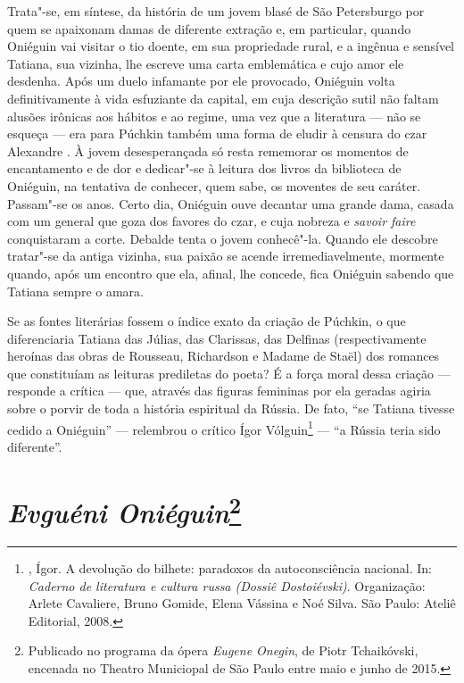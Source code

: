 Trata"-se, em síntese, da história de um jovem blasé de São Petersburgo
por quem se apaixonam damas de diferente extração e, em particular,
quando Oniéguin vai visitar o tio doente, em sua propriedade rural, e a
ingênua e sensível Tatiana, sua vizinha, lhe escreve uma carta
emblemática e cujo amor ele desdenha. Após um duelo infamante por ele
provocado, Oniéguin volta definitivamente à vida esfuziante da capital,
em cuja descrição sutil não faltam alusões irônicas aos hábitos e ao
regime, uma vez que a literatura --- não se esqueça --- era para Púchkin
também uma forma de eludir à censura do czar Alexandre . À jovem
desesperançada só resta rememorar os momentos de encantamento e de dor e
dedicar"-se à leitura dos livros da biblioteca de Oniéguin, na tentativa
de conhecer, quem sabe, os moventes de seu caráter. Passam"-se os anos.
Certo dia, Oniéguin ouve decantar uma grande dama, casada com um general
que goza dos favores do czar, e cuja nobreza e \emph{savoir faire} conquistaram
a corte. Debalde tenta o jovem conhecê"-la. Quando ele descobre tratar"-se
da antiga vizinha, sua paixão se acende irremediavelmente, mormente
quando, após um encontro que ela, afinal, lhe concede, fica Oniéguin
sabendo que Tatiana sempre o amara.

Se as fontes literárias fossem o índice exato da criação de Púchkin, o
que diferenciaria Tatiana das Júlias, das Clarissas, das Delfinas
(respectivamente heroínas das obras de Rousseau, Richardson e Madame de
Staël) dos romances que constituíam as leituras prediletas do poeta? É a força
moral dessa criação --- responde a crítica --- que, através das figuras
femininas por ela geradas agiria sobre o porvir de toda a história
espiritual da Rússia. De fato, ``se Tatiana tivesse cedido a Oniéguin'' ---
relembrou o crítico Ígor Vólguin\footnote{, Ígor. A devolução do bilhete: paradoxos da
autoconsciência nacional. In: \emph{Caderno de literatura e cultura russa (Dossiê Dostoiévski)}. Organização: Arlete Cavaliere, Bruno Gomide, Elena Vássina e Noé Silva. São Paulo: Ateliê Editorial, 2008.} --- ``a Rússia teria sido diferente''.

\chapter{\emph{Evguéni Oniéguin}\footnote{Publicado no programa da ópera \emph{Eugene Onegin}, de Piotr Tchaikóvski, encenada no Theatro Municiopal de São Paulo entre maio e junho de 2015.}}

